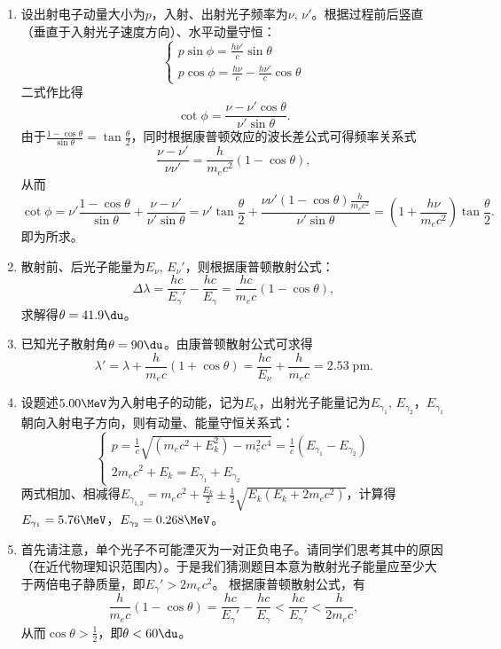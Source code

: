 \begin{enumerate}[label=1.\arabic*]
\item
设出射电子动量大小为$p$，入射、出射光子频率为$\nu,\,\nu'$。根据过程前后竖直（垂直于入射光子速度方向）、水平动量守恒：
\[
\begin{cases}
p\sin\phi = \frac{h\nu'}{c}\sin\theta \\
p\cos\phi = \frac{h\nu}{c}-\frac{h\nu'}{c}\cos\theta
\end{cases}
\]
二式作比得
\[\cot\phi = \frac{\nu-\nu'\cos\theta}{\nu'\sin\theta}.\]
由于$\frac{1-\cos\theta}{\sin\theta} = \tan\frac{\theta}{2}$，同时根据康普顿效应的波长差公式可得频率关系式
\[\frac{\nu-\nu'}{\nu\nu'} = \frac{h}{m_e c^2}(1-\cos\theta),\]
从而
\[\cot\phi = \nu'\frac{1-\cos\theta}{\sin\theta}+\frac{\nu-\nu'}{\nu'\sin\theta} = \nu'\tan\frac{\theta}{2}+\frac{\nu\nu'(1-\cos\theta)\frac{h}{m_e c^2}}{\nu'\sin\theta} = (1+\frac{h\nu}{m_e c^2})\tan\frac{\theta}{2}.\]
即为所求。

\item
散射前、后光子能量为$E_\nu,\,E_\nu'$，则根据康普顿散射公式：
\[\Delta \lambda = \frac{hc}{E_\gamma'}-\frac{hc}{E_\gamma} = \frac{hc}{m_e c}(1-\cos\theta),\]
求解得$\theta=41.9\du$。

\item
已知光子散射角$\theta = 90\du$。由康普顿散射公式可求得
\[\lambda' = \lambda+\frac{h}{m_e c}(1+\cos\theta) = \frac{hc}{E_\nu}+\frac{h}{m_e c} = 2.53\;\mathrm{pm}.\]

\item
设题述$5.00\MeV$为入射电子的动能，记为$E_k$，出射光子能量记为$E_{\gamma_1},\,E_{\gamma_2}$，$E_{\gamma_1}$朝向入射电子方向，则有动量、能量守恒关系式：
\[
\begin{cases}
p = \frac{1}{c}\sqrt{(m_e c^2 + E_k^2)-m_e^2 c^4} = \frac{1}{c}(E_{\gamma_1}-E_{\gamma_2})
\\
2m_e c^2 + E_k = E_{\gamma_1}+E_{\gamma_2}
\end{cases}
\]
两式相加、相减得$E_{\gamma_{1,2}} = m_e c^2+\frac{E_k}{2} \pm \frac{1}{2}\sqrt{E_k(E_k+2m_e c^2)}$，计算得$E_{\gamma_1}=5.76\MeV$，$E_{\gamma_2}=0.268\MeV$。

\item
{\color{red}首先请注意，单个光子不可能湮灭为一对正负电子。}请同学们思考其中的原因（在近代物理知识范围内）。于是我们猜测题目本意为散射光子能量应至少大于两倍电子静质量，即$E_\gamma'>2m_e c^2$。
根据康普顿散射公式，有
\[\frac{h}{m_e c}(1-\cos\theta) = \frac{hc}{E_\gamma'}-\frac{hc}{E_\gamma} < \frac{hc}{E_\gamma'}<\frac{h}{2m_e c},\]
从而$\cos\theta>\frac{1}{2}$，即$\theta<60\du$。


\end{enumerate}
